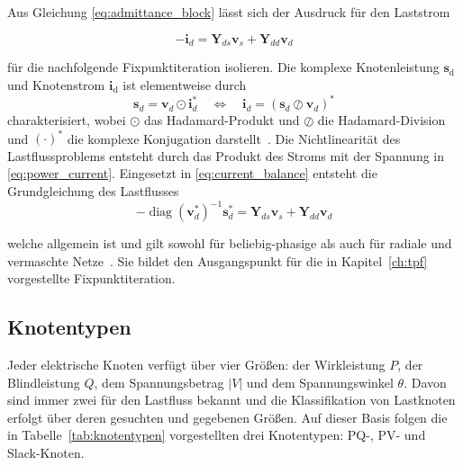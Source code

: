 Aus Gleichung \eqref{eq:admittance_block} lässt sich der Ausdruck für den Laststrom 

\begin{equation}
	\label{eq:current_balance}
	-\mathbf{i}_d = \mathbf{Y}_{ds}\mathbf{v}_s + \mathbf{Y}_{dd}\mathbf{v}_d
\end{equation}

für die nachfolgende Fixpunktiteration isolieren.
Die komplexe Knotenleistung $\mathbf{s}_\mathrm{d}$ und Knotenstrom $\mathbf{i}_\mathrm{d}$ ist elementweise durch
\begin{equation}
	\label{eq:power_current}
	\mathbf{s}_d = \mathbf{v}_d \odot \mathbf{i}_d^{*}
	\quad\Longleftrightarrow\quad
	\mathbf{i}_d = \left(\mathbf{s}_d \oslash \mathbf{v}_d\right)^{*}
\end{equation}
charakterisiert, wobei $\odot$ das Hadamard-Produkt und $\oslash$ die Hadamard-Division und $(\cdot)^{*}$ die komplexe Konjugation darstellt~\cite{Grainger1994, Milano2010, Bernstein2018}. 
Die Nichtlinearität des Lastflussproblems entsteht durch das Produkt des Stroms mit der Spannung in \eqref{eq:power_current}. 
Eingesetzt in \eqref{eq:current_balance} entsteht die Grundgleichung des Lastflusses
\begin{equation}
	\label{eq:pf_fundamental}
	-\operatorname{diag}(\mathbf{v}_d^{*})^{-1}\mathbf{s}_d^{*} = \mathbf{Y}_{ds}\mathbf{v}_s + \mathbf{Y}_{dd}\mathbf{v}_d
\end{equation}

welche allgemein ist und gilt sowohl für beliebig-phasige als auch für radiale und vermaschte Netze~\cite{Salazar2024}. Sie bildet den Ausgangspunkt für die in Kapitel~\ref{ch:tpf} vorgestellte Fixpunktiteration.

\subsection{Knotentypen}
\label{subsec:knotentypen}

Jeder elektrische Knoten verfügt über vier Größen: der Wirkleistung $P$, der Blindleistung $Q$, dem Spannungsbetrag $|V|$ und dem Spannungswinkel $\theta$. 
Davon sind immer zwei für den Lastfluss bekannt und die Klassifikation von Lastknoten erfolgt über deren gesuchten und gegebenen Größen. 
Auf dieser Basis folgen die in Tabelle~\ref{tab:knotentypen} vorgestellten drei Knotentypen: PQ-, PV- und Slack-Knoten.\\ 

